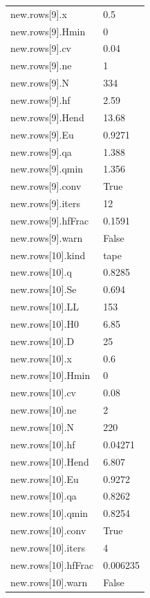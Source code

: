 {\begin{longtable}{p{}p{}}
{}new.rows[9].x & 0.5\\
{}new.rows[9].Hmin & 0\\
{}new.rows[9].cv & 0.04\\
{}new.rows[9].ne & 1\\
{}new.rows[9].N & 334\\
{}new.rows[9].hf & 2.59\\
{}new.rows[9].Hend & 13.68\\
{}new.rows[9].Eu & 0.9271\\
{}new.rows[9].qa & 1.388\\
{}new.rows[9].qmin & 1.356\\
{}new.rows[9].conv & True\\
{}new.rows[9].iters & 12\\
{}new.rows[9].hfFrac & 0.1591\\
{}new.rows[9].warn & False\\
{}new.rows[10].kind & tape\\
{}new.rows[10].q & 0.8285\\
{}new.rows[10].Se & 0.694\\
{}new.rows[10].LL & 153\\
{}new.rows[10].H0 & 6.85\\
{}new.rows[10].D & 25\\
{}new.rows[10].x & 0.6\\
{}new.rows[10].Hmin & 0\\
{}new.rows[10].cv & 0.08\\
{}new.rows[10].ne & 2\\
{}new.rows[10].N & 220\\
{}new.rows[10].hf & 0.04271\\
{}new.rows[10].Hend & 6.807\\
{}new.rows[10].Eu & 0.9272\\
{}new.rows[10].qa & 0.8262\\
{}new.rows[10].qmin & 0.8254\\
{}new.rows[10].conv & True\\
{}new.rows[10].iters & 4\\
{}new.rows[10].hfFrac & 0.006235\\
{}new.rows[10].warn & False\\
\bottomrule\end{longtable}}

